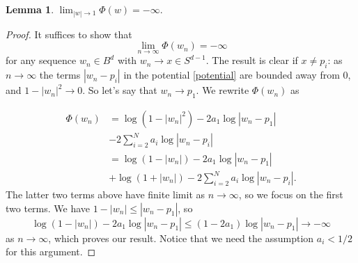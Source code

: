 \documentclass[%
 aip,
 amsmath,amssymb,
 reprint,%
]{revtex4-1}
\newtheorem{lemma}[theorem]{Lemma}
\begin{document}
\begin{lemma}
$\displaystyle \lim_{|w| \to 1} \Phi(w) = -\infty.$
\end{lemma}
\begin{proof}
It suffices to show that
$$
\lim_{n \to \infty} \Phi(w_n) = -\infty
$$
for any sequence $w_n \in B^d$ with $w_n \to x \in S^{d-1}$.  The result is clear if $x \ne p_i$: as $n \to \infty$  the terms $|w_n - p_i|$ in the potential  \eqref{potential} are bounded away from $0$, and $1 - |w_n|^2 \to 0$.  So let's say that $w_n \to p_1$.  We rewrite $\Phi(w_n)$ as

\begin{align*}
\Phi(w_n) &= \log (1 - |w_n|^2) - 2 a_1 \log  |w_n - p_1| \\&-2  \sum _{i = 2}^N  a_i \log  |w_n - p_i| \\&= \log(1 - |w_n|) - 2 a_1 \log  |w_n - p_1| \\&+ \log (1 + |w_n|) - 2  \sum _{i = 2}^N  a_i \log  |w_n - p_i|.
\end{align*}
The latter two terms above have finite limit as $n \to \infty$, so we focus on the first two terms.  We have $ 1 - |w_n| \le |w_n-p_1| $, so
$$
 \log (1 - |w_n|) - 2 a_1 \log  |w_n - p_1|  \le (1 -2a_1) \log  |w_n - p_1|  \to -\infty
 $$
as $n \to \infty$, which proves our result.  Notice that we need the assumption $a_i < 1/2$ for this argument.
\end{proof}
\end{document}
